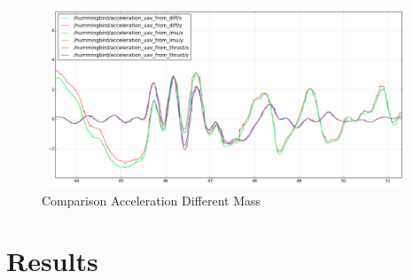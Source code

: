 \begin{figure}[!ht]
    \centering
    \includegraphics[width=0.97\textwidth]{img/comparison_acc_mass_changed.png}
    \caption{Comparison Acceleration Different Mass}
    \label{fig:comparison_acc_mass_changed}
\end{figure}

\section{Results}

